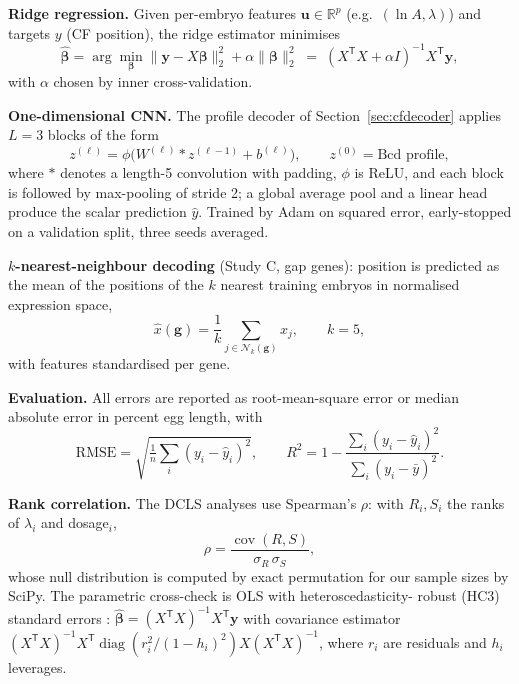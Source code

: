 \textbf{Ridge regression.} Given per-embryo features $\mathbf{u} \in
\mathbb{R}^p$ (e.g.\ $(\ln A, \lambda)$) and targets $y$ (CF position), the
ridge estimator minimises
\begin{equation}
\hat{\boldsymbol\beta} = \arg\min_{\boldsymbol\beta}
\|\mathbf{y} - X\boldsymbol\beta\|_2^2 + \alpha \|\boldsymbol\beta\|_2^2
\;=\; (X^{\mathsf T} X + \alpha I)^{-1} X^{\mathsf T} \mathbf{y},
\label{eq:ridge}
\end{equation}
with $\alpha$ chosen by inner cross-validation.

\textbf{One-dimensional CNN.} The profile decoder of
Section~\ref{sec:cfdecoder} applies $L = 3$ blocks of the form
\begin{equation}
z^{(\ell)} = \phi\!\big( W^{(\ell)} * z^{(\ell-1)} + b^{(\ell)} \big),
\qquad z^{(0)} = \text{Bcd profile},
\label{eq:cnn}
\end{equation}
where $*$ denotes a length-5 convolution with padding, $\phi$ is ReLU, and
each block is followed by max-pooling of stride 2; a global average pool and
a linear head produce the scalar prediction $\hat y$. Trained by Adam on
squared error, early-stopped on a validation split, three seeds averaged.

\textbf{$k$-nearest-neighbour decoding} (Study C, gap genes): position is
predicted as the mean of the positions of the $k$ nearest training embryos in
normalised expression space,
\begin{equation}
\hat x(\mathbf{g}) = \frac{1}{k} \sum_{j \in \mathcal{N}_k(\mathbf{g})} x_j,
\qquad k = 5,
\label{eq:knn}
\end{equation}
with features standardised per gene.

\textbf{Evaluation.} All errors are reported as root-mean-square error or
median absolute error in percent egg length, with
\begin{equation}
\mathrm{RMSE} = \sqrt{\tfrac{1}{n}\textstyle\sum_i (y_i - \hat y_i)^2},
\qquad
R^2 = 1 - \frac{\sum_i (y_i - \hat y_i)^2}{\sum_i (y_i - \bar y)^2}.
\label{eq:rmse}
\end{equation}

\textbf{Rank correlation.} The DCLS analyses use Spearman's $\rho$: with
$R_i, S_i$ the ranks of $\lambda_i$ and dosage$_i$,
\begin{equation}
\rho = \frac{\operatorname{cov}(R, S)}{\sigma_R \, \sigma_S},
\label{eq:spearman}
\end{equation}
whose null distribution is computed by exact permutation for our sample
sizes by SciPy. The parametric cross-check is OLS with heteroscedasticity-
robust (HC3) standard errors \cite{liu2013}: $\hat{\boldsymbol\beta} =
(X^{\mathsf T}X)^{-1} X^{\mathsf T} \mathbf{y}$ with covariance estimator
$(X^{\mathsf T}X)^{-1} X^{\mathsf T} \operatorname{diag}(r_i^2 /
(1-h_i)^2) X (X^{\mathsf T}X)^{-1}$, where $r_i$ are residuals and $h_i$
leverages.

